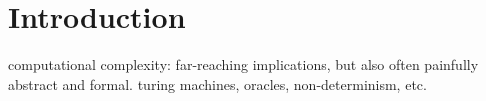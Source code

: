 \chapter{Introduction}

computational complexity: far-reaching implications, but also often painfully
abstract and formal.  turing machines, oracles, non-determinism, etc.


%

